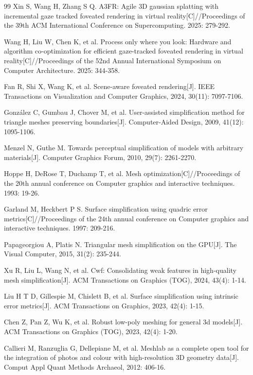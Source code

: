 \begin{thebibliography}{99}
Xin S, Wang H, Zhang S Q. A3FR: Agile 3D gaussian splatting with incremental gaze tracked foveated rendering in virtual reality[C]//Proceedings of the 39th ACM International Conference on Supercomputing. 2025: 279-292.

Wang H, Liu W, Chen K, et al. Process only where you look: Hardware and algorithm co-optimization for efficient gaze-tracked foveated rendering in virtual reality[C]//Proceedings of the 52nd Annual International Symposium on Computer Architecture. 2025: 344-358.

Fan R, Shi X, Wang K, et al. Scene-aware foveated rendering[J]. IEEE Transactions on Visualization and Computer Graphics, 2024, 30(11): 7097-7106.

González C, Gumbau J, Chover M, et al. User-assisted simplification method for triangle meshes preserving boundaries[J]. Computer-Aided Design, 2009, 41(12): 1095-1106.

Menzel N, Guthe M. Towards perceptual simplification of models with arbitrary materials[J]. Computer Graphics Forum, 2010, 29(7): 2261-2270.

Hoppe H, DeRose T, Duchamp T, et al. Mesh optimization[C]//Proceedings of the 20th annual conference on Computer graphics and interactive techniques. 1993: 19-26.

Garland M, Heckbert P S. Surface simplification using quadric error metrics[C]//Proceedings of the 24th annual conference on Computer graphics and interactive techniques. 1997: 209-216.

Papageorgiou A, Platis N. Triangular mesh simplification on the GPU[J]. The Visual Computer, 2015, 31(2): 235-244.

Xu R, Liu L, Wang N, et al. Cwf: Consolidating weak features in high-quality mesh simplification[J]. ACM Transactions on Graphics (TOG), 2024, 43(4): 1-14.

Liu H T D, Gillespie M, Chislett B, et al. Surface simplification using intrinsic error metrics[J]. ACM Transactions on Graphics, 2023, 42(4): 1-15.

Chen Z, Pan Z, Wu K, et al. Robust low-poly meshing for general 3d models[J]. ACM Transactions on Graphics (TOG), 2023, 42(4): 1-20.

Callieri M, Ranzuglia G, Dellepiane M, et al. Meshlab as a complete open tool for the integration of photos and colour with high-resolution 3D geometry data[J]. Comput Appl Quant Methods Archaeol, 2012: 406-16.


\end{thebibliography}
